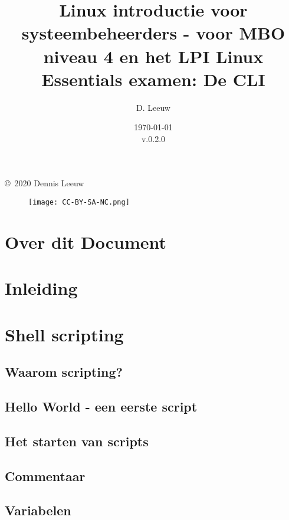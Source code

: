 \documentclass[a4paper,12pt,twoside,openright,titlepage]{book}
\author{D. Leeuw}
\title{Linux introductie voor systeembeheerders - voor MBO niveau 4 en het LPI Linux Essentials examen: De CLI}
\date{\today\\v.0.2.0}
\begin{document}

\maketitle

\copyright\ 2020 Dennis Leeuw\\

\begin{figure}
	\texttt{[image: CC-BY-SA-NC.png]}
\end{figure}

\bigskip




\frontmatter
\chapter{Over dit Document}


\tableofcontents

\mainmatter
\chapter{Inleiding}


\chapter{Shell scripting}

\section{Waarom scripting?}

\section{Hello World - een eerste script}

\section{Het starten van scripts}

\section{Commentaar}

\section{Variabelen}



\end{document}
